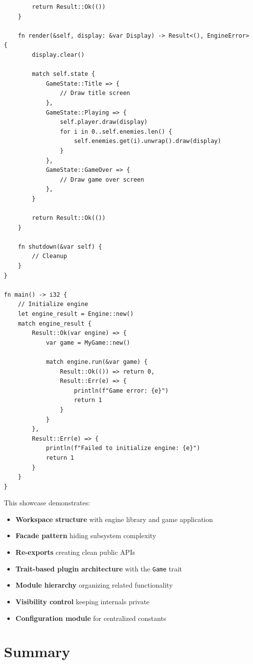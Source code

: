 \begin{lstlisting}
        return Result::Ok(())
    }

    fn render(&self, display: &var Display) -> Result<(), EngineError> {
        display.clear()

        match self.state {
            GameState::Title => {
                // Draw title screen
            },
            GameState::Playing => {
                self.player.draw(display)
                for i in 0..self.enemies.len() {
                    self.enemies.get(i).unwrap().draw(display)
                }
            },
            GameState::GameOver => {
                // Draw game over screen
            },
        }

        return Result::Ok(())
    }

    fn shutdown(&var self) {
        // Cleanup
    }
}

fn main() -> i32 {
    // Initialize engine
    let engine_result = Engine::new()
    match engine_result {
        Result::Ok(var engine) => {
            var game = MyGame::new()

            match engine.run(&var game) {
                Result::Ok(()) => return 0,
                Result::Err(e) => {
                    println(f"Game error: {e}")
                    return 1
                }
            }
        },
        Result::Err(e) => {
            println(f"Failed to initialize engine: {e}")
            return 1
        }
    }
}
\end{lstlisting}

This showcase demonstrates:
\begin{itemize}
    \item \textbf{Workspace structure} with engine library and game application
    \item \textbf{Facade pattern} hiding subsystem complexity
    \item \textbf{Re-exports} creating clean public APIs
    \item \textbf{Trait-based plugin architecture} with the \texttt{Game} trait
    \item \textbf{Module hierarchy} organizing related functionality
    \item \textbf{Visibility control} keeping internals private
    \item \textbf{Configuration module} for centralized constants
\end{itemize}

\section{Summary}
\label{sec:modules-summary}

